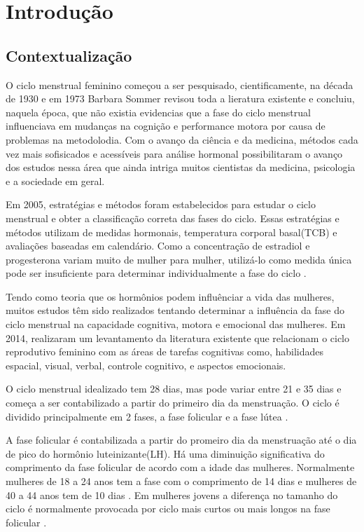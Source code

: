 \chapter[Introdução]{Introdução}

\section{Contextualização}

O ciclo menstrual feminino começou a ser pesquisado, cientificamente, na década de 1930 \cite{frank1931} e em 1973 Barbara Sommer revisou toda a lieratura existente e concluiu, naquela época, que não existia evidencias que a fase do ciclo menstrual influenciava em mudanças na cognição e performance motora por causa de problemas na metodolodia. Com o avanço da ciência e da medicina, métodos cada vez mais sofisicados e acessíveis para análise hormonal possibilitaram o avanço dos estudos nessa área que ainda intriga muitos cientistas da medicina, psicologia e a sociedade em geral.

Em 2005, estratégias e métodos foram estabelecidos para estudar o ciclo menstrual e obter a classificação correta das fases do ciclo\cite{becker2005}. Essas estratégias e métodos utilizam de medidas hormonais, temperatura corporal basal(TCB) e avaliações baseadas em calendário. Como a concentração de estradiol e progesterona variam muito de mulher para mulher, utilizá-lo como medida única pode ser insuficiente para determinar individualmente a fase do ciclo \cite{poroma2014}.

Tendo como teoria que os hormônios podem influênciar a vida das mulheres, muitos estudos têm sido realizados tentando determinar a influência da fase do ciclo menstrual na capacidade cognitiva, motora e emocional das mulheres. Em 2014,  realizaram um levantamento da literatura existente que relacionam o ciclo reprodutivo feminino com as áreas de tarefas cognitivas como, habilidades espacial, visual, verbal, controle cognitivo, e aspectos emocionais.

O ciclo menstrual idealizado tem 28 dias, mas pode variar entre 21 e 35 dias \cite{lenton1984a} e começa a ser contabilizado a partir do primeiro dia da menstruação. O ciclo é dividido principalmente em 2 fases, a fase folicular e a fase lútea \cite{brondin2008}.

A fase folicular é contabilizada a partir do promeiro dia da menstruação até o dia de pico do hormônio luteinizante(LH). Há uma diminuição significativa do comprimento da fase folicular de acordo com a idade das mulheres. Normalmente mulheres de 18 a 24 anos tem a fase com o comprimento de 14 dias e mulheres de 40 a 44 anos tem de 10 dias \cite{lenton1984a}. Em mulheres jovens a diferença no tamanho do ciclo é normalmente provocada por ciclo mais curtos ou mais longos na fase folicular \cite{lenton1984a}.

